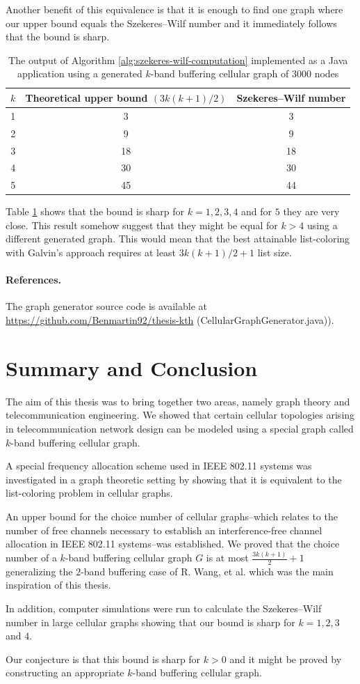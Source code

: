 \documentclass[a4paper, 12pt]{article}
\begin{document}
Another benefit of this equivalence is that it is enough to find one graph where our upper bound equals the Szekeres\---Wilf number and it immediately follows that the bound is sharp.
\begin{table}[h!]
\centering
\begin{tabular}{|c|c|c|}
\hline
 $k$& Theoretical upper bound $(3k(k+1)/2)$ & Szekeres\---Wilf number \\ \hline
 1&  3&  3 \\ \hline
 2&  9&  9\\ \hline
 3&  18& 18\\ \hline
 4&  30& 30\\ \hline
 5&  45& 44 \\ \hline
\end{tabular}
\caption{The output of Algorithm \ref{alg:szekeres-wilf-computation} implemented as a Java application using a generated $k$-band buffering cellular graph of $3000$ nodes}
\label{eval-szekeres}
\end{table}

Table \ref{eval-szekeres} shows that the bound is sharp for $k=1,2,3,4$ and for $5$ they are very close. This result somehow suggest that they might be equal for $k > 4$ using a different generated graph. This would mean that the best attainable list-coloring with Galvin's approach requires at least $3k(k+1)/2+1$ list size.
\paragraph*{References.} The graph generator source code is available at \url{https://github.com/Benmartin92/thesis-kth} (CellularGraphGenerator.java)).
\section{Summary and Conclusion}
The aim of this thesis was to bring together two areas, namely graph theory and telecommunication engineering. We showed that certain cellular topologies arising in telecommunication network design can be modeled using a special graph called $k$-band buffering cellular graph.

A special frequency allocation scheme used in IEEE 802.11 systems was investigated in a graph theoretic setting by showing that it is equivalent to the list-coloring problem in cellular graphs.

An upper bound for the choice number of cellular graphs\---which relates to the number of free channels necessary to establish an interference-free channel allocation in IEEE 802.11 systems\---was established. We proved that the choice number of a $k$-band buffering cellular graph $G$ is at most $\frac{3k(k+1)}{2}+1$ generalizing the $2$-band buffering case of R. Wang, et al. \cite{7248845} which was the main inspiration of this thesis.

In addition, computer simulations were run to calculate the Szekeres\---Wilf number in large cellular graphs showing that our bound is sharp for $k=1,2,3$ and $4$. 

Our conjecture is that this bound is sharp for $k > 0$ and it might be proved by constructing an appropriate $k$-band buffering cellular graph.
\newpage
\printbibliography
{}
\end{document}
